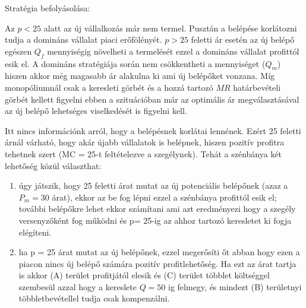 \documentclass[10pt,a4paper]{article}
\begin{document}
\begin{enumerate}[label=(\alph*)]

Stratégia befolyásolása: 

 
Az $p<25$ alatt az új vállalkozás már nem termel. Pusztán a belépése korlátozni tudja a domináns vállalat piaci erőfölényét. $p>25$ feletti ár esetén az új belépő egészen $Q_f$ mennyiségig  növelheti a termelését ezzel a domináns vállalat profittól esik el.
A domináns stratégiája során nem csökkentheti a mennyiséget ($Q_m$) hiszen akkor még magasabb ár alakulna ki ami új belépőket  vonzana.
Míg monopóliumnál csak a keresleti görbét és a hozzá tartozó $MR$ határbevételi görbét kellett figyelni ebben a szituációban  már az optimális ár megválasztásával az új belépő lehetséges viselkedését is figyelni kell.

Itt nincs információnk arról, hogy a belépésnek korlátai lennének. Ezért 25 feletti árnál várható,  hogy akár újabb vállalatok is belépnek, hiszen pozitív profitra tehetnek szert (MC = 25-t feltételezve a szegélynek).
Tehát a szénbánya két lehetőség közül választhat:
\begin{enumerate}[label=(\roman*)]

\item úgy játszik, hogy 25 feletti árat mutat az új potenciális belépőnek (azaz a $P_m=30$ árat), ekkor az be fog lépni ezzel a szénbánya profittól esik el; további belépőkre lehet ekkor számítani ami azt eredményezi hogy a szegély versenyzőként fog működni és p= 25-ig az ahhoz tartozó keresletet ki fogja elégíteni.


\item ha p = 25 árat mutat az új belépőnek, ezzel megerősíti őt abban hogy ezen a piacon nincs új belépő számára pozitív profitlehetőség.  Ha ezt az árat tartja is akkor (A) terület profitjától elesik és (C) terület többlet költséggel szembesül azzal hogy a kereslete $Q=50$ ig felmegy, és mindezt (B) területnyi többletbevétellel tudja csak kompenzálni.


\end{enumerate}
\end{enumerate}
\end{document}
